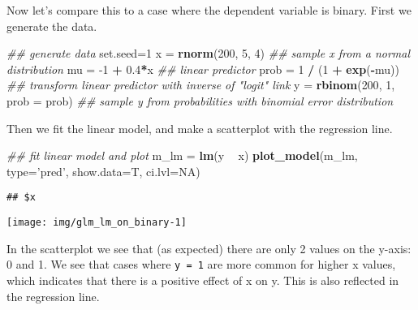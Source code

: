 \documentclass[
]{article}
\newenvironment{Shaded}{\begin{snugshade}}{\end{snugshade}}
\newcommand{\CommentTok}[1]{\textcolor[rgb]{0.56,0.35,0.01}{\textit{#1}}}
\newcommand{\DataTypeTok}[1]{\textcolor[rgb]{0.13,0.29,0.53}{#1}}
\newcommand{\DecValTok}[1]{\textcolor[rgb]{0.00,0.00,0.81}{#1}}
\newcommand{\FloatTok}[1]{\textcolor[rgb]{0.00,0.00,0.81}{#1}}
\newcommand{\KeywordTok}[1]{\textcolor[rgb]{0.13,0.29,0.53}{\textbf{#1}}}
\newcommand{\NormalTok}[1]{#1}
\newcommand{\OperatorTok}[1]{\textcolor[rgb]{0.81,0.36,0.00}{\textbf{#1}}}
\newcommand{\OtherTok}[1]{\textcolor[rgb]{0.56,0.35,0.01}{#1}}
\newcommand{\StringTok}[1]{\textcolor[rgb]{0.31,0.60,0.02}{#1}}
\begin{document}
Now let's compare this to a case where the dependent variable is binary.
First we generate the data.

\begin{Shaded}
\begin{Highlighting}[]
\CommentTok{## generate data}
\NormalTok{set.seed=}\DecValTok{1}
\NormalTok{x =}\StringTok{ }\KeywordTok{rnorm}\NormalTok{(}\DecValTok{200}\NormalTok{, }\DecValTok{5}\NormalTok{, }\DecValTok{4}\NormalTok{)              }\CommentTok{## sample x from a normal distribution}
\NormalTok{mu =}\StringTok{ }\DecValTok{-1} \OperatorTok{+}\StringTok{ }\FloatTok{0.4}\OperatorTok{*}\NormalTok{x                   }\CommentTok{## linear predictor}
\NormalTok{prob =}\StringTok{ }\DecValTok{1} \OperatorTok{/}\StringTok{ }\NormalTok{(}\DecValTok{1} \OperatorTok{+}\StringTok{ }\KeywordTok{exp}\NormalTok{(}\OperatorTok{-}\NormalTok{mu))         }\CommentTok{## transform linear predictor with inverse of "logit" link}
\NormalTok{y =}\StringTok{ }\KeywordTok{rbinom}\NormalTok{(}\DecValTok{200}\NormalTok{, }\DecValTok{1}\NormalTok{, }\DataTypeTok{prob =}\NormalTok{ prob)   }\CommentTok{## sample y from probabilities with binomial error distribution}
\end{Highlighting}
\end{Shaded}

Then we fit the linear model, and make a scatterplot with the regression
line.

\begin{Shaded}
\begin{Highlighting}[]
\CommentTok{## fit linear model and plot}
\NormalTok{m_lm =}\StringTok{ }\KeywordTok{lm}\NormalTok{(y }\OperatorTok{~}\StringTok{ }\NormalTok{x)}
\KeywordTok{plot_model}\NormalTok{(m_lm, }\DataTypeTok{type=}\StringTok{'pred'}\NormalTok{, }\DataTypeTok{show.data=}\NormalTok{T, }\DataTypeTok{ci.lvl=}\OtherTok{NA}\NormalTok{)}
\end{Highlighting}
\end{Shaded}

\begin{verbatim}
## $x
\end{verbatim}

\begin{center}\texttt{[image: img/glm\_lm\_on\_binary-1]} \end{center}

In the scatterplot we see that (as expected) there are only 2 values on
the y-axis: 0 and 1. We see that cases where \texttt{y\ =\ 1} are more
common for higher x values, which indicates that there is a positive
effect of x on y. This is also reflected in the regression line.
\end{document}
